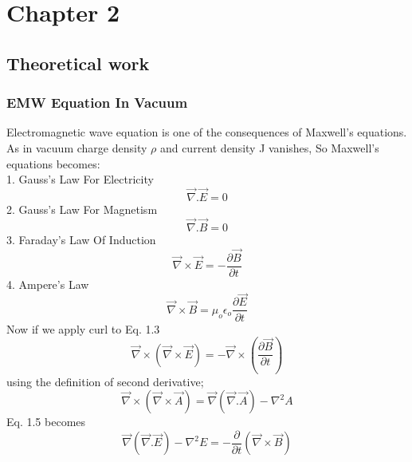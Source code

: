 %
\chapter{Chapter 2}
\section{Theoretical work}

\subsection{EMW Equation In Vacuum}
Electromagnetic wave equation is one of the consequences of Maxwell’s equations.\\
As in vacuum charge density $\rho$ and current density J vanishes, So Maxwell's equations becomes:\\
1. Gauss’s Law For Electricity\\
\begin{equation}
\vec{\nabla}.\vec{E} = 0
\end{equation}
2. Gauss’s Law For Magnetism\\
\begin{equation}
\vec{\nabla}.\vec{B} = 0
\end{equation}
3. Faraday’s Law Of Induction\\
\begin{equation}
\vec{\nabla}\times\vec{E} = - \frac{\partial\vec{B}}{\partial t}
\end{equation}
4. Ampere’s Law\\
\begin{equation}
\vec{\nabla}\times\vec{B} = \mu_{o}\epsilon_{o}\frac{\partial\vec{E}}{\partial t}
\end{equation}
Now if we apply curl to Eq. 1.3\\
\begin{equation}
\vec{\nabla}\times(\vec{\nabla}\times\vec{E}) = - \vec{\nabla}\times(\frac{\partial\vec{B}}{\partial t})
\end{equation}
using the definition of second derivative;\\
\begin{equation}
\vec{\nabla}\times(\vec{\nabla}\times\vec{A}) = \vec{\nabla}(\vec{\nabla}.\vec{A})-{\nabla}^2A
\end{equation}
Eq. 1.5 becomes\\
\begin{equation}
\vec{\nabla}(\vec{\nabla}.\vec{E})-{\nabla}^2E = - \frac{\partial}{\partial t}(\vec{\nabla}\times\vec{B})
\end{equation}
